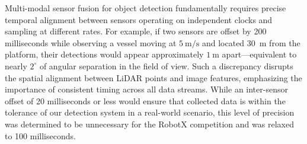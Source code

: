 \documentclass{erauthesis}
\begin{document}


Multi-modal sensor fusion for object detection fundamentally requires precise temporal alignment between sensors operating on independent clocks and sampling at different rates.  
For example, if two sensors are offset by 200 milliseconds while observing a vessel moving at $5~\mathrm{m/s}$ and located 30~m from the platform, their detections would appear approximately $1~\mathrm{m}$ apart—equivalent to nearly $2^{\circ}$ of angular separation in the field of view.  
Such a discrepancy disrupts the spatial alignment between LiDAR points and image features, emphasizing the importance of consistent timing across all data streams.
While an inter-sensor offset of 20 milliseconds or less would ensure that collected data is within the tolerance of our detection system in a real-world scenario, this level of precision was determined to be unnecessary for the RobotX competition and was relaxed to 100 milliseconds.


\end{document}
